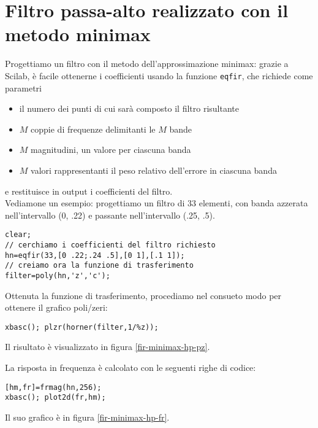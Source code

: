 \section{Filtro passa-alto realizzato con il metodo minimax}
Progettiamo un filtro con il metodo dell'approssimazione minimax: grazie a Scilab, \`e facile ottenerne i coefficienti usando la funzione \verb+eqfir+, che richiede come parametri
\begin{itemize}
\item il numero dei punti di cui sar\`a composto il filtro risultante 
\item $M$ coppie di frequenze delimitanti le $M$ bande
\item $M$ magnitudini, un valore per ciascuna banda
\item $M$ valori rappresentanti il peso relativo dell'errore in ciascuna banda
\end{itemize}
e restituisce in output i coefficienti del filtro.\\
Vediamone un esempio: progettiamo un filtro di 33 elementi, con banda azzerata nell'intervallo (0, .22) e passante nell'intervallo (.25, .5).

\begin{verbatim}
clear;
// cerchiamo i coefficienti del filtro richiesto
hn=eqfir(33,[0 .22;.24 .5],[0 1],[.1 1]);
// creiamo ora la funzione di trasferimento 
filter=poly(hn,'z','c');
\end{verbatim}
Ottenuta la funzione di trasferimento, procediamo nel consueto modo per ottenere il grafico poli/zeri:
\begin{verbatim}
xbasc(); plzr(horner(filter,1/%z)); 
\end{verbatim}
Il risultato \`e visualizzato in figura \ref{fir-minimax-hp-pz}.

La risposta in frequenza \`e calcolato con le seguenti righe di codice:
\begin{verbatim}
[hm,fr]=frmag(hn,256);
xbasc(); plot2d(fr,hm);
\end{verbatim}
Il suo grafico \`e in figura \ref{fir-minimax-hp-fr}.


